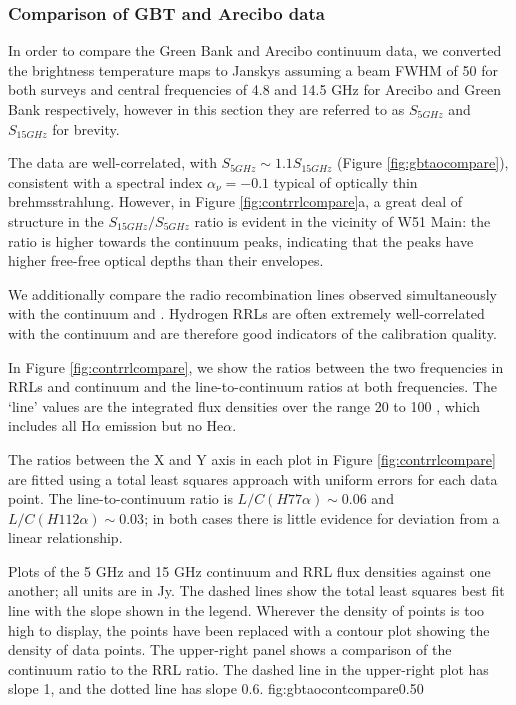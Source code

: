 \subsubsection{Comparison of GBT and Arecibo data}
In order to compare the Green Bank and Arecibo continuum data, we converted
the brightness temperature maps to Janskys assuming a beam FWHM of 50\arcsec
for both surveys and central frequencies of 4.8 and 14.5 GHz for Arecibo and
Green Bank respectively, however in this section they are referred to as $S_{5
GHz}$ and $S_{15 GHz}$ for brevity.

The data are well-correlated, with $S_{5 GHz} \sim 1.1 S_{15 GHz}$ (Figure
\ref{fig:gbtaocompare}), consistent with a spectral index $\alpha_\nu=-0.1$
typical of optically thin brehmsstrahlung.
However, in Figure \ref{fig:contrrlcompare}a, a great deal of structure in the
$S_{15 GHz}/S_{5 GHz}$ ratio is evident in the vicinity of W51 Main: the ratio
is higher towards the continuum peaks, indicating that the peaks have higher
free-free optical depths than their envelopes.

We additionally compare the radio recombination lines observed simultaneously
with the continuum and \formaldehyde.  Hydrogen RRLs are often extremely
well-correlated with the continuum and are therefore good indicators of the
calibration quality.

In Figure \ref{fig:contrrlcompare}, we show the ratios between the two
frequencies in RRLs and continuum and the line-to-continuum ratios at both
frequencies.  The `line' values are the integrated flux densities over the
range 20 to 100 \kms, which includes all H$\alpha$ emission but no He$\alpha$.

The ratios between the X and Y axis in each plot in Figure
\ref{fig:contrrlcompare} are fitted using a total least squares approach with
uniform errors for each data point.   The line-to-continuum ratio is
$L/C(H77\alpha)\sim0.06$ and $L/C(H112\alpha)\sim0.03$; in both cases there is
little evidence for deviation from a linear relationship.


{Plots of the 5 GHz and 15 GHz continuum and RRL flux densities against one
another; all units are in Jy.  The dashed lines show the total least squares
best fit line with the slope shown in the legend.  Wherever the density of
points is too high to display, the points have been replaced with a contour
plot showing the density of data points.  The upper-right panel shows a
comparison of the continuum ratio to the RRL ratio.  The dashed line in the
upper-right plot has slope 1, and the dotted line has slope 0.6.}
{fig:gbtaocontcompare}{0.5}{0}

